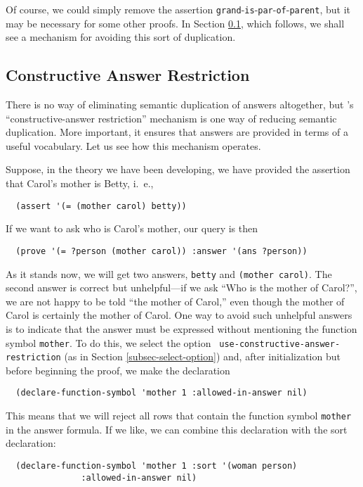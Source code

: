 Of course, we could simply remove the assertion {\tt grand}-{\tt is}-{\tt par}-{\tt of}-{\tt parent}, but it
may be necessary for some other proofs.  In Section
\ref{subsec-constructive-answer-restriction}, which follows, we shall
see a mechanism for avoiding this sort of duplication.

\subsection{Constructive Answer Restriction}
\label{subsec-constructive-answer-restriction}
There is no way of eliminating semantic duplication of answers
altogether, but \Snark\/'s ``constructive-answer restriction''
mechanism is one way of reducing semantic duplication.  More
important, it ensures that answers are provided in terms of a useful
vocabulary.  Let us see how this mechanism operates.

Suppose, in the theory we have been developing, we have provided the
assertion that Carol's mother is Betty, i.\  e.,
\begin{verbatim}
  (assert '(= (mother carol) betty))
\end{verbatim}
If we want to ask who is
Carol's mother, our query is then
\begin{verbatim}
  (prove '(= ?person (mother carol)) :answer '(ans ?person))
\end{verbatim}
As it stands now, we will get two answers, {\tt betty} and
\verb'(mother carol)'.  The second answer is correct but unhelpful---if
we ask ``Who is the mother of Carol?'', we are not happy to be told
``the mother of Carol,'' even though the mother of Carol is certainly
the mother of Carol.  One way to avoid such unhelpful answers is to
indicate that the answer must be expressed without mentioning the
function symbol {\tt mother}.  To do this, we select the option {\tt
use-}{\tt constructive-}{\tt answer-}{\tt restriction} (as in Section
\ref{subsec-select-option}) and, after
initialization but before beginning the proof, we make the declaration
\begin{verbatim}
  (declare-function-symbol 'mother 1 :allowed-in-answer nil)
\end{verbatim}

This means that we will reject all rows that contain the function
symbol {\tt mother} in the answer formula.  If we like, we can combine
this declaration with the sort declaration:
\begin{verbatim}
  (declare-function-symbol 'mother 1 :sort '(woman person)
			   :allowed-in-answer nil)
\end{verbatim}

